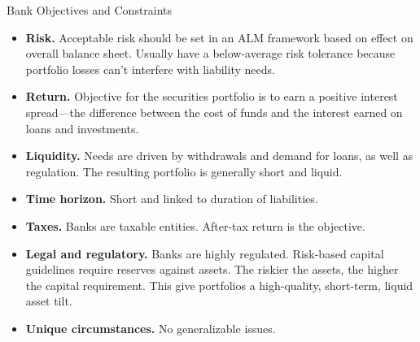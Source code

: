 \documentclass[../custom]{flashcards}
\begin{document}
\begin{flashcard}[\studyArea]{Bank Objectives and Constraints}
    \begin{itemize}
        \item \textbf{Risk.} Acceptable risk should be set in an ALM framework based on effect on overall balance sheet. Usually have a below-average risk tolerance because portfolio losses can't interfere with liability needs.
        \item \textbf{Return.} Objective for the securities portfolio is to earn a positive interest spread---the difference between the cost of funds and the interest earned on loans and investments.
        \item \textbf{Liquidity.} Needs are driven by withdrawals and demand for loans, as well as regulation. The resulting portfolio is generally short and liquid.
        \item \textbf{Time horizon.} Short and linked to duration of liabilities.
        \item \textbf{Taxes.} Banks are taxable entities. After-tax return is the objective.
        \item \textbf{Legal and regulatory.} Banks are highly regulated. Risk-based capital guidelines require reserves against assets. The riskier the assets, the higher the capital requirement. This give portfolios a high-quality, short-term, liquid asset tilt.
        \item \textbf{Unique circumstances.} No generalizable issues.
    \end{itemize}
\end{flashcard}
\end{document}
